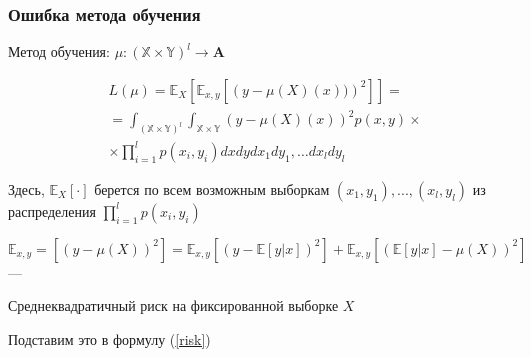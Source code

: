 \documentclass[fleqn,pdf, 9pt, usenames, dvipsnames, unicode, hyperref={bookmarks=true,bookmarksopen=false, bookmarksnumbered}]{beamer}
\begin{document}
\begin{frame}\frametitle{Ошибка метода обучения}

Метод обучения: $\mu : (\mathbb{X}\times\mathbb{Y})^l \rightarrow \mathbf{A}$

\begin{equation}
\begin{split}
	&L(\mu) = \mathbb{E}_X\left[\mathbb{E}_{x,y}\left[ \left(y-\mu(X)(x))\right)^2\right]\right] =  \\ &=\int_{(\mathbb{X}\times\mathbb{Y})^l}\int_{\mathbb{X}\times\mathbb{Y}} \left(y-\mu(X)(x)\right)^2 p(x,y) \times \\ &\times \prod^l_{i=1}p(x_i,y_i)dxdydx_1dy_1,\ldots dx_ldy_l
	\label{risk}
	\end{split}
\end{equation}

Здесь, $\mathbb{E}_X[\cdot]$ берется по всем возможным выборкам ${(x_1, y_1), . . . ,(x_l, y_l)}$
из распределения $\prod_{i=1}^{l}p(x_i,y_i)$

$\mathbb{E}_{x,y} = \left[(y-\mu(X))^2\right] = \mathbb{E}_{x,y}\left[(y-\mathbb{E}[y|x])^2\right] + \mathbb{E}_{x,y}\left[(\mathbb{E}[y|x] - \mu(X))^2\right]$ ---

Среднеквадратичный риск на фиксированной выборке $X$

Подставим это в формулу (\ref {risk})

\end{frame}

\end{document}
